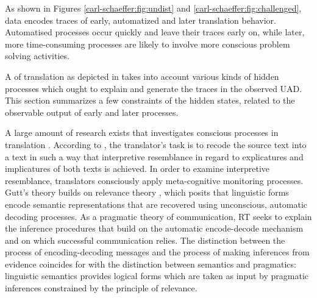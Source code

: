 \documentclass[output=paper]{LSP/langsci}
\begin{document}
As shown in Figures \ref{carl-schaeffer:fig:undist} and \ref{carl-schaeffer:fig:challenged},  data encodes traces of early, automatized and later translation behavior. Automatised processes occur quickly and leave their traces early on, while later, more time-consuming processes are likely to involve more conscious problem solving activities. 

A  of translation as depicted in  takes into account various kinds of hidden processes which ought to explain and generate the traces in the observed UAD. This section summarizes a few constraints of the hidden states, related to the observable output of early and later processes. 

A large amount of research exists that investigates conscious processes in translation \citep[e.g.][]{Jaaskelainen1991,Loerscher2005}.  According to \citet{Gutt1989}, the translator's task is to recode the source text into a  text in such a way that interpretive resemblance in regard to explicatures and implicatures of both texts is achieved. In order to examine interpretive resemblance, translators consciously apply meta-cognitive monitoring processes. 
Gutt's theory builds on relevance theory \citep[RT,][]{Sperber1995}, which posits that linguistic forms encode semantic representations that are recovered using unconscious, automatic decoding processes. As a pragmatic theory of communication, RT seeks to explain the inference procedures that build on the automatic encode-decode mechanism and on which successful communication relies. The  distinction between the process of encoding-decoding messages and the process of making inferences from evidence coincides for  \citet{Blakemore2002} with  the distinction between semantics and pragmatics: linguistic semantics provides logical forms which are taken as input by pragmatic inferences constrained by the principle of relevance. 
\end{document}
